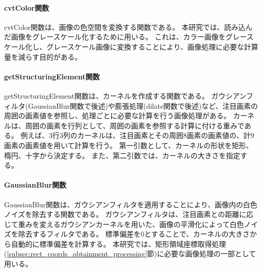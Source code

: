 \paragraph{cvtColor関数}
cvtColor関数は、画像の色空間を変換する関数である。
本研究では、読み込んだ画像をグレースケール化するために用いる。
これは、カラー画像をグレースケール化し、グレースケール画像に変換することにより、画像処理に必要な計算量を減らす目的がある。

\paragraph{getStructuringElement関数}
getStructuringElement関数は、カーネルを作成する関数である。
ガウシアンフィルタ(GaussianBlur関数で後述)や膨張処理(dilate関数で後述)など、注目画素の周囲の画素値を参照し、処理ごとに必要な計算を行う画像処理がある。
カーネルは、周囲の画素を行列として、周囲の画素を参照する計算に付ける重みである。
例えば、3行3列のカーネルは、注目画素とその周囲8画素の画素値の、計9画素の画素値を用いて計算を行う。
第一引数として、カーネルの形状を矩形、楕円、十字から決定する。
また、第二引数では、カーネルの大きさを指定する。

\paragraph{GaussianBlur関数}
GaussianBlur関数は、ガウシアンフィルタを適用することにより、画像内の白色ノイズを除去する関数である。
ガウシアンフィルタは、注目画素との距離に応じて重みを変えるガウシアンカーネルを用いた、画像の平滑化によって白色ノイズを除去するフィルタである。
標準偏差を0とすることで、カーネルの大きさから自動的に標準偏差を計算する\cite{ガウシアンフィルタ}。
本研究では、矩形領域座標取得処理(\ref{subsec:rect_coords_obtainment_processing}節)に必要な画像処理の一部として用いる。

